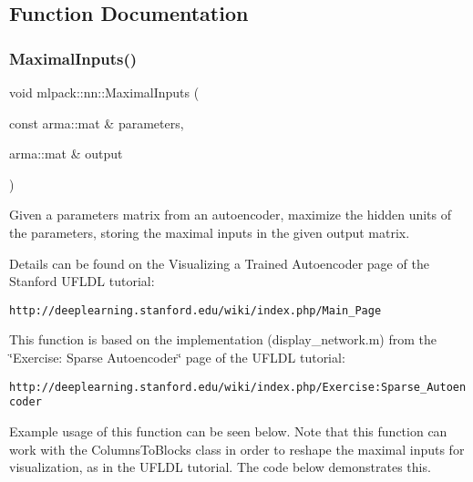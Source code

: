 \subsection{Function Documentation}
\mbox{\label{namespacemlpack_1_1nn_a5fcd73722265acc12d00ba8d32db6f17}} 
\subsubsection{Maximal\+Inputs()}
{\footnotesize\ttfamily void mlpack\+::nn\+::\+Maximal\+Inputs (\begin{DoxyParamCaption}\item[{const arma\+::mat \&}]{parameters,  }\item[{arma\+::mat \&}]{output }\end{DoxyParamCaption})}



Given a parameters matrix from an autoencoder, maximize the hidden units of the parameters, storing the maximal inputs in the given output matrix. 

Details can be found on the \textquotesingle{}Visualizing a Trained Autoencoder\textquotesingle{} page of the Stanford U\+F\+L\+DL tutorial\+:

{\tt http\+://deeplearning.\+stanford.\+edu/wiki/index.\+php/\+Main\+\_\+\+Page}

This function is based on the implementation (display\+\_\+network.\+m) from the \char`\"{}\+Exercise\+: Sparse Autoencoder\char`\"{} page of the U\+F\+L\+DL tutorial\+:

{\tt http\+://deeplearning.\+stanford.\+edu/wiki/index.\+php/\+Exercise\+:\+Sparse\+\_\+\+Autoencoder}

Example usage of this function can be seen below. Note that this function can work with the Columns\+To\+Blocks class in order to reshape the maximal inputs for visualization, as in the U\+F\+L\+DL tutorial. The code below demonstrates this.


